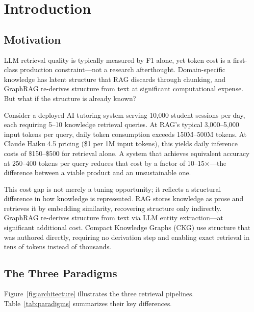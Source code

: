 \section{Introduction}\label{sec:introduction}

\subsection{Motivation}\label{sec:motivation}

LLM retrieval quality is typically measured by F1 alone, yet token cost is
a first-class production constraint---not a research afterthought. Domain-specific
knowledge has latent structure that RAG discards through chunking, and GraphRAG
re-derives structure from text at significant computational expense. But what if
the structure is already known?

Consider a deployed AI tutoring system serving 10,000 student sessions per day,
each requiring 5--10 knowledge retrieval queries. At RAG's typical 3,000--5,000
input tokens per query, daily token consumption exceeds 150M--500M tokens.
At Claude Haiku 4.5 pricing (\$1 per 1M input tokens), this yields daily
inference costs of \$150--\$500 for retrieval alone. A system that achieves
equivalent accuracy at 250--400 tokens per query reduces that cost by a factor
of 10--15$\times$---the difference between a viable product and an unsustainable one.

This cost gap is not merely a tuning opportunity; it reflects a structural
difference in how knowledge is represented. RAG stores knowledge as prose and
retrieves it by embedding similarity, recovering structure only indirectly.
GraphRAG re-derives structure from text via LLM entity extraction---at
significant additional cost. Compact Knowledge Graphs (CKG) use structure that
was authored directly, requiring no derivation step and enabling exact retrieval
in tens of tokens instead of thousands.

\subsection{The Three Paradigms}\label{sec:paradigms}

Figure~\ref{fig:architecture} illustrates the three retrieval pipelines.
Table~\ref{tab:paradigms} summarizes their key differences.

